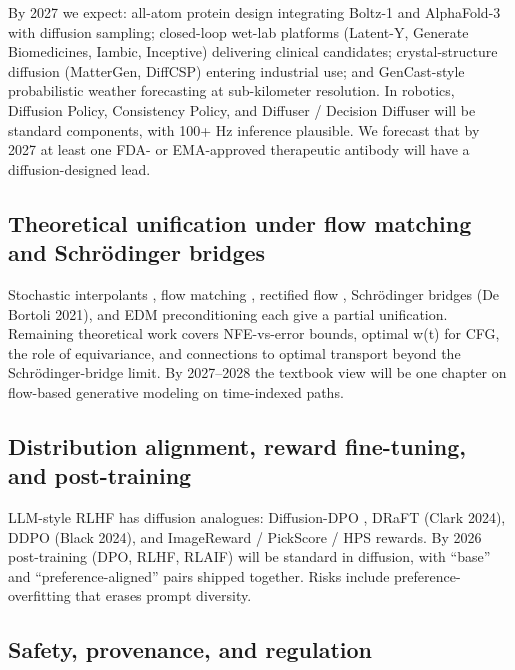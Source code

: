 \documentclass{article}
\begin{document}
By 2027 we expect: all-atom protein design integrating Boltz-1 and AlphaFold-3 with diffusion sampling; closed-loop wet-lab platforms (Latent-Y, Generate Biomedicines, Iambic, Inceptive) delivering clinical candidates; crystal-structure diffusion (MatterGen, DiffCSP) entering industrial use; and GenCast-style probabilistic weather forecasting at sub-kilometer resolution. In robotics, Diffusion Policy, Consistency Policy, and Diffuser / Decision Diffuser will be standard components, with 100+ Hz inference plausible. We forecast that by 2027 at least one FDA- or EMA-approved therapeutic antibody will have a diffusion-designed lead.

\subsection{Theoretical unification under flow matching and Schrödinger bridges}\label{theoretical-unification-under-flow-matching-and-schruxf6dinger-bridges}

Stochastic interpolants \citep{albergo2023stochasticinterpol}, flow matching \citep{lipman2023flowmatchingforgen}, rectified flow \citep{liu2023zero1to3zeroshoton}, Schrödinger bridges (De Bortoli 2021), and EDM preconditioning each give a partial unification. Remaining theoretical work covers NFE-vs-error bounds, optimal w(t) for CFG, the role of equivariance, and connections to optimal transport beyond the Schrödinger-bridge limit. By 2027--2028 the textbook view will be one chapter on flow-based generative modeling on time-indexed paths.

\subsection{Distribution alignment, reward fine-tuning, and post-training}\label{distribution-alignment-reward-fine-tuning-and-post-training}

LLM-style RLHF has diffusion analogues: Diffusion-DPO \citep{wallace20242024}, DRaFT (Clark 2024), DDPO (Black 2024), and ImageReward / PickScore / HPS rewards. By 2026 post-training (DPO, RLHF, RLAIF) will be standard in diffusion, with ``base'' and ``preference-aligned'' pairs shipped together. Risks include preference-overfitting that erases prompt diversity.

\subsection{Safety, provenance, and regulation}\label{safety-provenance-and-regulation}
\end{document}
